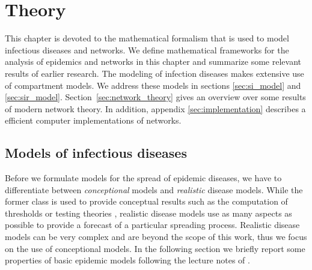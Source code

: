 %
%
%
%
%
%
%
%


\chapter{Theory}\label{sec:theory}
This chapter is devoted to the mathematical formalism that is used to model infectious diseases and networks.
We define mathematical frameworks for the analysis of epidemics and networks in this chapter and summarize some relevant results of earlier research.
The modeling of infection diseases makes extensive use of compartment models.
We address these models in sections \ref{sec:si_model} and \ref{sec:sir_model}.
Section~\ref{sec:network_theory} gives an overview over some results of modern network theory.
In addition, appendix \ref{sec:implementation} describes a efficient computer implementations of networks.

\section{Models of infectious diseases}

%

Before we formulate models for the spread of epidemic diseases, we have to differentiate between \emph{conceptional} models and \emph{realistic} disease models.
While the former class is used to provide conceptual results such as the computation of thresholds or testing theories \citep{Hethcote:2000}, realistic disease models use as many aspects as possible to provide a forecast of a particular spreading process.
Realistic disease models can be very complex and are beyond the scope of this work, thus we focus on the use of conceptional models.
In the following section we briefly report some properties of basic epidemic models following the lecture notes of \citeauthor{Chasnov:2010} \citep{Chasnov:2010}.

